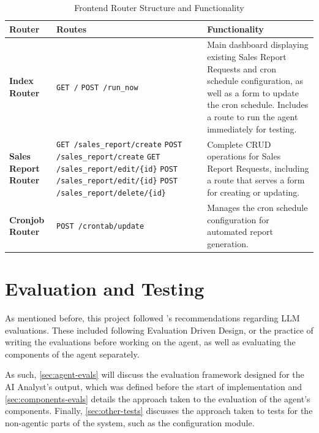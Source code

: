 \documentclass[a4paper]{report}
\begin{document}
\begin{table}[H]
\centering
\begin{tabular}{|p{2.5cm}|p{5.5cm}|p{6.5cm}|}
\hline
\textbf{Router} & \textbf{Routes} & \textbf{Functionality} \\ \hline
\textbf{Index Router} & 
\texttt{GET /} \newline \texttt{POST /run\_now} & 
Main dashboard displaying existing Sales Report Requests and cron schedule configuration, as well as a form to update the cron schedule. Includes a route to run the agent immediately for testing. \\ \hline
\textbf{Sales Report Router} & 
\texttt{GET /sales\_report/create} \newline \texttt{POST /sales\_report/create} \newline \texttt{GET /sales\_report/edit/\{id\}} \newline \texttt{POST /sales\_report/edit/\{id\}} \newline \texttt{POST /sales\_report/delete/\{id\}} & 
Complete CRUD operations for Sales Report Requests, including a route that serves a form for creating or updating. \\ \hline

\textbf{Cronjob Router} & 
\texttt{POST /crontab/update} & 
Manages the cron schedule configuration for automated report generation. \\ \hline
\end{tabular}
\caption{Frontend Router Structure and Functionality}
\label{tab:frontend-routes}
\end{table}

\chapter{Evaluation and Testing}
\label{chapter:evaluation-testing}

As mentioned before, this project followed \cite{aiebook2025}'s recommendations regarding LLM evaluations. These included following Evaluation Driven Design, or the practice of writing the evaluations before working on the agent, as well as evaluating the components of the agent separately.

As such, \autoref{sec:agent-evals} will discuss the evaluation framework designed for the AI Analyst's output, which was defined before the start of implementation and \autoref{sec:components-evals} details the approach taken to the evaluation of the agent's components. Finally, \autoref{sec:other-tests} discusses the approach taken to tests for the non-agentic parts of the system, such as the configuration module.
\end{document}
